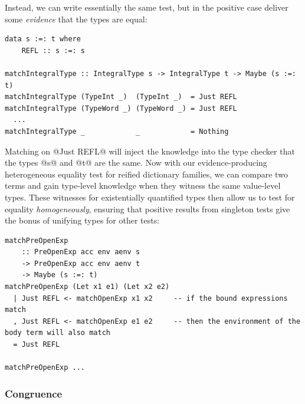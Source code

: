 Instead, we can write essentially the same test, but in the positive case
deliver some \emph{evidence} that the types are equal:
%
\begin{lstlisting}[style=haskell]
data s :=: t where
    REFL :: s :=: s

matchIntegralType :: IntegralType s -> IntegralType t -> Maybe (s :=: t)
matchIntegralType (TypeInt _)  (TypeInt _)  = Just REFL
matchIntegralType (TypeWord _) (TypeWord _) = Just REFL
  ...
matchIntegralType _            _            = Nothing
\end{lstlisting}
%
Matching on @Just REFL@ will inject the knowledge into the type
checker that the types @s@ and @t@ are the same. Now with our
evidence-producing heterogeneous equality test for reified dictionary families,
we can compare two terms and gain type-level knowledge when they witness the
same value-level types. These witnesses for existentially quantified types then
allow us to test for equality \emph{homogeneously}, ensuring that positive
results from singleton tests give the bonus of unifying types for other tests:
%
\begin{lstlisting}[style=haskell]
matchPreOpenExp
    :: PreOpenExp acc env aenv s
    -> PreOpenExp acc env aenv t
    -> Maybe (s :=: t)
matchPreOpenExp (Let x1 e1) (Let x2 e2)
  | Just REFL <- matchOpenExp x1 x2     -- if the bound expressions match
  , Just REFL <- matchOpenExp e1 e2     -- then the environment of the body term will also match
  = Just REFL

matchPreOpenExp ...
\end{lstlisting}


\subsubsection{Congruence}

